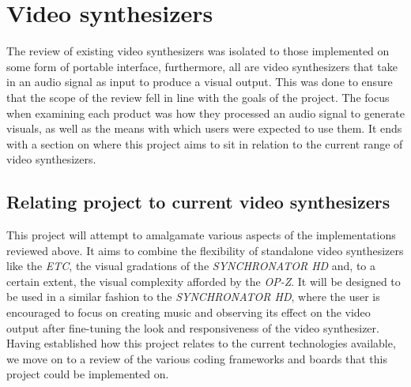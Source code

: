 \documentclass[../initial_thesis.tex]{subfiles}
\begin{document}
\section{Video synthesizers} \label{sec:vsynths}
The review of existing video synthesizers was isolated to those implemented on some form of portable interface, furthermore, all are video synthesizers that take in an audio signal as input to produce a visual output. This was done to ensure that the scope of the review fell in line with the goals of the project. The focus when examining each product was how they processed an audio signal to generate visuals, as well as the means with which users were expected to use them. It ends with a section on where this project aims to sit in relation to the current range of video synthesizers.




\subsection{Relating project to current video synthesizers}
This project will attempt to amalgamate various aspects of the implementations reviewed above. It aims to combine the flexibility of standalone video synthesizers like the \textit{ETC}, the visual gradations of the \textit{SYNCHRONATOR HD} and, to a certain extent, the visual complexity afforded by the \textit{OP-Z}. It will be designed to be used in a similar fashion to the \textit{SYNCHRONATOR HD}, where the user is encouraged to focus on creating music and observing its effect on the video output after fine-tuning the look and responsiveness of the video synthesizer. Having established how this project relates to the current technologies available, we move on to a review of the various coding frameworks and boards that this project could be implemented on.
\end{document}
